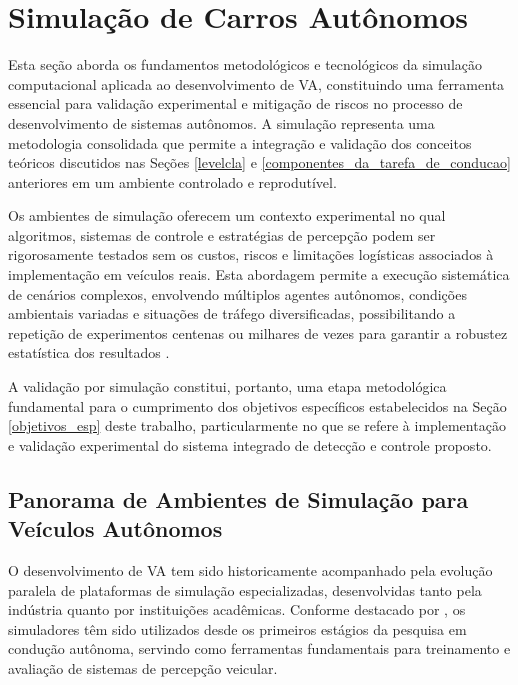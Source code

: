 \section{Simulação de Carros Autônomos}\label{controlador_controle_de_VA-simulador}

Esta seção aborda os fundamentos metodológicos e tecnológicos da simulação computacional aplicada ao desenvolvimento de VA, constituindo uma ferramenta essencial para validação experimental e mitigação de riscos no processo de desenvolvimento de sistemas autônomos. A simulação representa uma metodologia consolidada que permite a integração e validação dos conceitos teóricos discutidos nas Seções \ref{levelcla} e \ref{componentes_da_tarefa_de_conducao} anteriores em um ambiente controlado e reprodutível.

Os ambientes de simulação oferecem um contexto experimental no qual algoritmos, sistemas de controle e estratégias de percepção podem ser rigorosamente testados sem os custos, riscos e limitações logísticas associados à implementação em veículos reais. Esta abordagem permite a execução sistemática de cenários complexos, envolvendo múltiplos agentes autônomos, condições ambientais variadas e situações de tráfego diversificadas, possibilitando a repetição de experimentos centenas ou milhares de vezes para garantir a robustez estatística dos resultados \cite[p. ~1]{dosovitskiy2017carla}.

A validação por simulação constitui, portanto, uma etapa metodológica fundamental para o cumprimento dos objetivos específicos estabelecidos na Seção \ref{objetivos_esp} deste trabalho, particularmente no que se refere à implementação e validação experimental do sistema integrado de detecção e controle proposto.

\subsection{Panorama de Ambientes de Simulação para Veículos Autônomos}

O desenvolvimento de VA tem sido historicamente acompanhado pela evolução paralela de plataformas de simulação especializadas, desenvolvidas tanto pela indústria quanto por instituições acadêmicas. Conforme destacado por , os simuladores têm sido utilizados desde os primeiros estágios da pesquisa em condução autônoma, servindo como ferramentas fundamentais para treinamento e avaliação de sistemas de percepção veicular.


